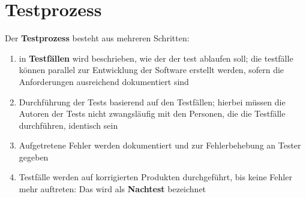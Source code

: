 \section{Testprozess}
Der \textbf{Testprozess} besteht aus mehreren Schritten:

\begin{enumerate}
    \item in \textbf{Testfällen} wird beschrieben, wie der der test ablaufen soll; die testfälle können parallel zur Entwicklung der Software erstellt werden, sofern die Anforderungen ausreichend dokumentiert sind
    \item Durchführung der Tests basierend auf den Testfällen; hierbei müssen die Autoren der Tests nicht zwangsläufig mit den Personen, die die Testfälle durchführen, identisch sein
    \item Aufgetretene Fehler werden dokumentiert und zur Fehlerbehebung an Tester gegeben
    \item Testfälle werden auf korrigierten Produkten durchgeführt, bis keine Fehler mehr auftreten: Das wird als \textbf{Nachtest} bezeichnet
\end{enumerate}